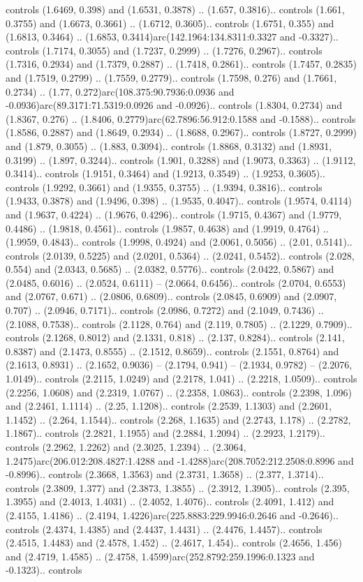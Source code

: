controls (1.6469, 0.398) and (1.6531, 0.3878) .. (1.657, 0.3816).. controls (1.661, 0.3755) and (1.6673, 0.3661) .. (1.6712, 0.3605).. controls (1.6751, 0.355) and (1.6813, 0.3464) .. (1.6853, 0.3414)arc(142.1964:134.8311:0.3327 and -0.3327).. controls (1.7174, 0.3055) and (1.7237, 0.2999) .. (1.7276, 0.2967).. controls (1.7316, 0.2934) and (1.7379, 0.2887) .. (1.7418, 0.2861).. controls (1.7457, 0.2835) and (1.7519, 0.2799) .. (1.7559, 0.2779).. controls (1.7598, 0.276) and (1.7661, 0.2734) .. (1.77, 0.272)arc(108.375:90.7936:0.0936 and -0.0936)arc(89.3171:71.5319:0.0926 and -0.0926).. controls (1.8304, 0.2734) and (1.8367, 0.276) .. (1.8406, 0.2779)arc(62.7896:56.912:0.1588 and -0.1588).. controls (1.8586, 0.2887) and (1.8649, 0.2934) .. (1.8688, 0.2967).. controls (1.8727, 0.2999) and (1.879, 0.3055) .. (1.883, 0.3094).. controls (1.8868, 0.3132) and (1.8931, 0.3199) .. (1.897, 0.3244).. controls (1.901, 0.3288) and (1.9073, 0.3363) .. (1.9112, 0.3414).. controls (1.9151, 0.3464) and (1.9213, 0.3549) .. (1.9253, 0.3605).. controls (1.9292, 0.3661) and (1.9355, 0.3755) .. (1.9394, 0.3816).. controls (1.9433, 0.3878) and (1.9496, 0.398) .. (1.9535, 0.4047).. controls (1.9574, 0.4114) and (1.9637, 0.4224) .. (1.9676, 0.4296).. controls (1.9715, 0.4367) and (1.9779, 0.4486) .. (1.9818, 0.4561).. controls (1.9857, 0.4638) and (1.9919, 0.4764) .. (1.9959, 0.4843).. controls (1.9998, 0.4924) and (2.0061, 0.5056) .. (2.01, 0.5141).. controls (2.0139, 0.5225) and (2.0201, 0.5364) .. (2.0241, 0.5452).. controls (2.028, 0.554) and (2.0343, 0.5685) .. (2.0382, 0.5776).. controls (2.0422, 0.5867) and (2.0485, 0.6016) .. (2.0524, 0.6111) -- (2.0664, 0.6456).. controls (2.0704, 0.6553) and (2.0767, 0.671) .. (2.0806, 0.6809).. controls (2.0845, 0.6909) and (2.0907, 0.707) .. (2.0946, 0.7171).. controls (2.0986, 0.7272) and (2.1049, 0.7436) .. (2.1088, 0.7538).. controls (2.1128, 0.764) and (2.119, 0.7805) .. (2.1229, 0.7909).. controls (2.1268, 0.8012) and (2.1331, 0.818) .. (2.137, 0.8284).. controls (2.141, 0.8387) and (2.1473, 0.8555) .. (2.1512, 0.8659).. controls (2.1551, 0.8764) and (2.1613, 0.8931) .. (2.1652, 0.9036) -- (2.1794, 0.941) -- (2.1934, 0.9782) -- (2.2076, 1.0149).. controls (2.2115, 1.0249) and (2.2178, 1.041) .. (2.2218, 1.0509).. controls (2.2256, 1.0608) and (2.2319, 1.0767) .. (2.2358, 1.0863).. controls (2.2398, 1.096) and (2.2461, 1.1114) .. (2.25, 1.1208).. controls (2.2539, 1.1303) and (2.2601, 1.1452) .. (2.264, 1.1544).. controls (2.268, 1.1635) and (2.2743, 1.178) .. (2.2782, 1.1867).. controls (2.2821, 1.1955) and (2.2884, 1.2094) .. (2.2923, 1.2179).. controls (2.2962, 1.2262) and (2.3025, 1.2394) .. (2.3064, 1.2475)arc(206.012:208.4827:1.4288 and -1.4288)arc(208.7052:212.2508:0.8996 and -0.8996).. controls (2.3668, 1.3563) and (2.3731, 1.3658) .. (2.377, 1.3714).. controls (2.3809, 1.377) and (2.3873, 1.3855) .. (2.3912, 1.3905).. controls (2.395, 1.3955) and (2.4013, 1.4031) .. (2.4052, 1.4076).. controls (2.4091, 1.412) and (2.4155, 1.4186) .. (2.4194, 1.4226)arc(225.8883:229.9946:0.2646 and -0.2646).. controls (2.4374, 1.4385) and (2.4437, 1.4431) .. (2.4476, 1.4457).. controls (2.4515, 1.4483) and (2.4578, 1.452) .. (2.4617, 1.454).. controls (2.4656, 1.456) and (2.4719, 1.4585) .. (2.4758, 1.4599)arc(252.8792:259.1996:0.1323 and -0.1323).. controls 